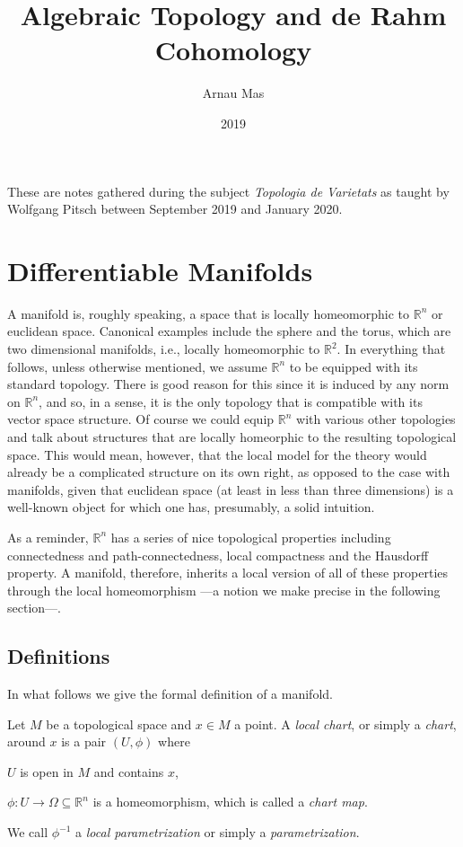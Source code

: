 \documentclass[12pt,oneside]{book}
\title{Algebraic Topology and de Rahm Cohomology}
\author{Arnau Mas}
\date{2019}
\numberwithin{table}{section}
\numberwithin{equation}{section}
\numberwithin{figure}{section}
\newcommand{\R}{\mathbb{R}}
\begin{document}
\maketitle

\frontmatter
\pagestyle{plain}
These are notes gathered during the subject \emph{Topologia de Varietats} as taught by Wolfgang Pitsch between September 2019 and January 2020.

\mainmatter

\chapter{Differentiable Manifolds}

A manifold is, roughly speaking, a space that is locally homeomorphic to \( \R^n \) or euclidean space. Canonical examples include the sphere and the torus, which are two dimensional manifolds, i.e., locally homeomorphic to \( \R^2 \). In everything that follows, unless otherwise mentioned, we assume \( \R^n \) to be equipped with its standard topology. There is good reason for this since it is induced by any norm on \( \R^n \), and so, in a sense, it is the only topology that is compatible with its vector space structure. Of course we could equip \( \R^n \) with various other topologies and talk about structures that are locally homeorphic to the resulting topological space. This would mean, however, that the local model for the theory would already be a complicated structure on its own right, as opposed to the case with manifolds, given that euclidean space (at least in less than three dimensions) is a well-known object for which one has, presumably, a solid intuition.  

As a reminder, \( \R^n \) has a series of nice topological properties including connectedness and path-connectedness, local compactness and the Hausdorff property. A manifold, therefore, inherits a local version of all of these properties through the local homeomorphism ---a notion we make precise in the following section---.

\section{Definitions}
In what follows we give the formal definition of a manifold. 
\begin{defn}
	Let \( M \) be a topological space and \( x \in M \) a point. A \emph{local chart}, or simply a \emph{chart}, around \( x \) is a pair \( (U, \phi) \)  where
	\begin{points}
		\item \( U \) is open in \( M \) and contains \( x \),
		\item \( \phi \colon U \to \Omega \subseteq \R^n \) is a homeomorphism, which is called a \emph{chart map}.
	\end{points}
We call \( \phi^{-1} \) a \emph{local parametrization} or simply a \emph{parametrization}.
\end{defn}
\end{document}
